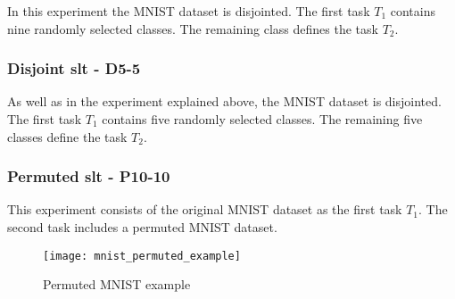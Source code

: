 In this experiment the MNIST dataset is disjointed.
The first task $T_1$ contains nine randomly selected classes.
The remaining class defines the task $T_2$.

\subsubsection*{Disjoint \acrshort{slt} - D5-5}

As well as in the experiment explained above, the MNIST dataset is disjointed.
The first task $T_1$ contains five randomly selected classes.
The remaining five classes define the task $T_2$.

\subsubsection*{Permuted \acrshort{slt} - P10-10}

This experiment consists of the original MNIST dataset as the first task $T_1$.
The second task includes a permuted MNIST dataset.

\begin{figure}[H]
    \centering
    \texttt{[image: mnist\_permuted\_example]}
    \caption{Permuted MNIST example}
    \label{fig:intro_mnist_permuted_example}
\end{figure}